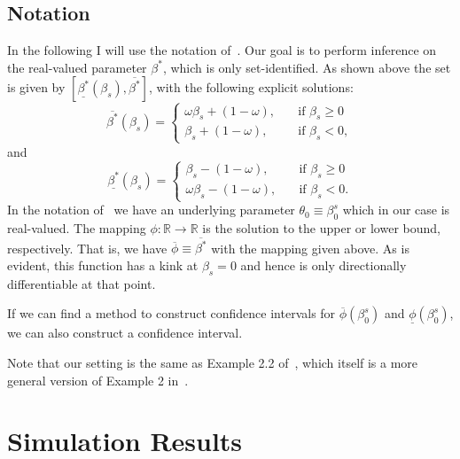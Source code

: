 \documentclass[11pt,a4paper,english]{article} %
\numberwithin{equation}{section}
\numberwithin{figure}{section}
\numberwithin{table}{section}
\theoremstyle{definition}
\theoremstyle{remark}
\begin{document}
\subsection*{Notation}
In the following I will use the notation of~\cite{fang2023inference}.
Our goal is to perform inference on the real-valued parameter $\beta^*$, which is only set-identified.
As shown above the set is given by $[\underline{\beta^*}(\beta_s), \overline{\beta^*}]$,
with the following explicit solutions:
\begin{equation*}
	\overline{\beta^*}(\beta_s)=
	\begin{cases}
		\omega \beta_s + (1 - \omega),& \quad \text{if } \beta_s \geq 0\\
		\beta_s + (1 - \omega),              & \quad \text{if } \beta_s < 0,
	\end{cases}
\end{equation*}
and
\begin{equation*}
	\underline{\beta^*}(\beta_s)=
	\begin{cases}
		\beta_s - (1 - \omega),& \quad \text{if } \beta_s \geq 0\\
		\omega \beta_s - (1 - \omega),              & \quad \text{if } \beta_s < 0.
	\end{cases}
\end{equation*}
In the notation of~\cite{fang2023inference} we have an underlying parameter $\theta_0 \equiv \beta_0^s$ which in our case is real-valued.
The mapping $\phi: \mathbb{R} \to \mathbb{R}$ is the solution to the upper or lower bound, respectively.
That is, we have $\overline{\phi} \equiv \overline{\beta^*}$ with the mapping given above.
As is evident, this function has a kink at $\beta_s = 0$ and hence is only directionally differentiable at that point.

If we can find a method to construct confidence intervals for $\overline{\phi}(\beta_0^s)$ and $\underline{\phi}(\beta_0^s)$, we can also construct a confidence interval.


Note that our setting is the same as Example 2.2 of~\cite{hong2018numerical}, which itself is a more general version of Example 2 in~\cite{fang2023inference}.

\section{Simulation Results}
\end{document}
